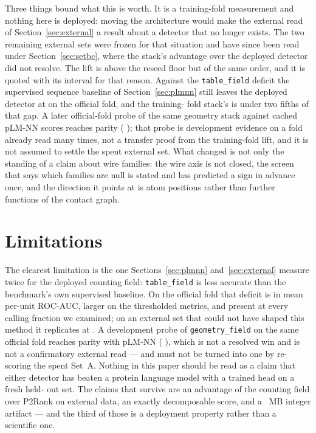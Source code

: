 \documentclass[11pt]{article}
\begin{document}
Three things bound what this is worth. It is a training-fold measurement and
nothing here is deployed: moving the architecture would make the external read
of Section~\ref{sec:external} a result about a detector that no longer exists.
The two remaining external sets were frozen for that situation and have since been
read under Section~\ref{sec:setbc}, where the stack's advantage over the deployed
detector did not resolve. The lift is
above the \SatReseed{} reseed floor but of the same order, and it is quoted with
its interval for that reason. Against the \texttt{table\_field} deficit the
supervised sequence baseline of Section~\ref{sec:plmnn} still leaves the deployed
detector at \PlmAucDelta{} \PlmAucCI{} on the official fold, and the training-
fold stack's \FamGeom{} is under two fifths of that gap. A later official-fold
probe of the same geometry stack against cached pLM-NN scores reaches parity
(\GeomFieldPlmDelta{} \GeomFieldPlmCI{}); that probe is development evidence on
a fold already read many times, not a transfer proof from the training-fold
lift, and it is not assumed to settle the spent external set. What changed is
not only the standing of a claim about wire families: the wire axis is not
closed, the screen that says which families are null is stated and has predicted
a sign in advance once, and the direction it points at is atom positions rather
than further functions of the contact graph.

\section{Limitations}
The clearest limitation is the one Sections~\ref{sec:plmnn}
and~\ref{sec:external} measure twice for the deployed counting field: 
\texttt{table\_field} is less accurate than the benchmark's own supervised
baseline. On the official fold that deficit is \PlmAucDelta{} \PlmAucCI{} in mean
per-unit ROC-AUC, larger on the thresholded metrics, and present at every calling
fraction we examined; on an external set that could not have shaped this method
it replicates at \ExtAucPlm{} \ExtAucCIPlm{}. A development probe of
\texttt{geometry\_field} on the same official fold reaches parity with pLM-NN
(\GeomFieldPlmDelta{} \GeomFieldPlmCI{}), which is not a resolved win and is not
a confirmatory external read --- and must not be turned into one by re-scoring
the spent Set~A. Nothing in this paper should be read as a claim that either
detector has beaten a protein language model with a trained head on a fresh held-
out set. The claims that survive are an advantage of the counting field over
P2Rank on external data, an exactly decomposable score, and a
\FairModelOurs{}~MB integer artifact --- and the third of those is a deployment
property rather than a scientific one.
\end{document}
